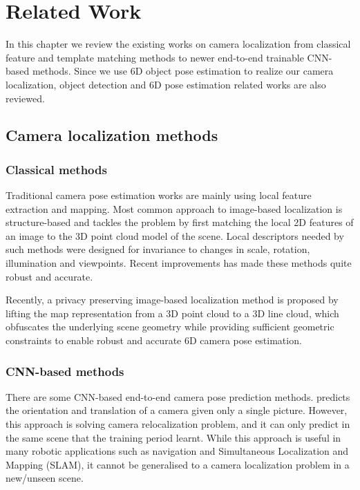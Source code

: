 \chapter{Related Work}

In this chapter we review the existing works on camera localization from classical feature and template matching methods to newer end-to-end trainable CNN-based methods. Since we use 6D object pose estimation to realize our camera localization, object detection and 6D pose estimation related works are also reviewed.

\section{Camera localization methods}

\subsection{Classical methods}

Traditional camera pose estimation works \cite{irschara2009structure, lim2015real, lynen2015get, zeisl2015camera, sattler2016efficient} are mainly using local feature extraction and mapping. Most common approach to image-based localization is structure-based and tackles the problem by first matching the local 2D features of an image to the 3D point cloud model of the scene. Local descriptors needed by such methods were designed for invariance to changes in scale, rotation, illumination and viewpoints. Recent improvements has made these methods quite robust and accurate.

Recently, a privacy preserving image-based localization method \cite{speciale2019privacy} is proposed by lifting the map representation from a 3D point cloud to a 3D line cloud, which obfuscates the underlying scene geometry while providing sufficient geometric constraints to enable robust and accurate 6D camera pose estimation.

\subsection{CNN-based methods}
There are some CNN-based end-to-end camera pose prediction methods. \cite{wu2017delving} predicts the orientation and translation of a camera given only a single picture. However, this approach is solving camera relocalization problem, and it can only predict in the same scene that the training period learnt. While this approach is useful in many robotic applications such as navigation and Simultaneous Localization and Mapping (SLAM), it cannot be generalised to a camera localization problem in a new/unseen scene. 

